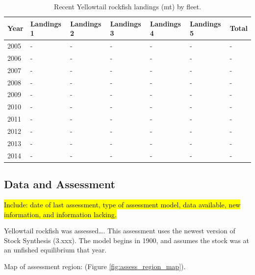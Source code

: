 \documentclass[12pt,]{article}
\begin{document}
\begin{table}[ht]
\centering
\caption{Recent Yellowtail rockfish landings (mt) by 
                                            fleet.} 
\label{tab:Exec_catch}
\begin{tabular}{l>{\centering}p{1in}>{\centering}p{1in}>{\centering}p{1in}>{\centering}p{.9in}>{\centering}p{.9in}>{\centering}p{.6in}}
  \hline
Year & Landings 1 & Landings 2 & Landings 3 & Landings 4 & Landings 5 & Total \\ 
  \hline
2005 & - & - & - & - & - & - \\ 
  2006 & - & - & - & - & - & - \\ 
  2007 & - & - & - & - & - & - \\ 
  2008 & - & - & - & - & - & - \\ 
  2009 & - & - & - & - & - & - \\ 
  2010 & - & - & - & - & - & - \\ 
  2011 & - & - & - & - & - & - \\ 
  2012 & - & - & - & - & - & - \\ 
  2013 & - & - & - & - & - & - \\ 
  2014 & - & - & - & - & - & - \\ 
   \hline
\end{tabular}
\end{table}

\FloatBarrier

\newpage

\subsection*{Data and Assessment}\label{data-and-assessment}

\hl{Include: date of last assessment, type of assessment model, data available, new 
information, and information lacking.}

Yellowtail rockfish was assessed\ldots{}. This assessment uses the
newest version of Stock Synthesis (3.xxx). The model begins in 1900, and
assumes the stock was at an unfished equilibrium that year.

Map of assessment region: (Figure \ref{fig:assess_region_map}).
\end{document}
